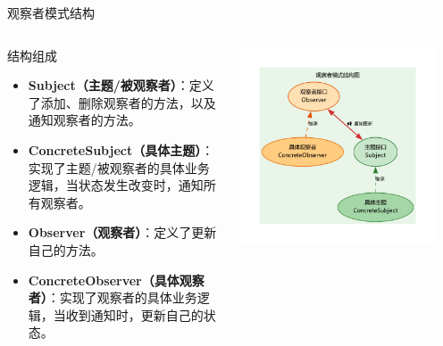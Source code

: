\documentclass[UTF8,aspectratio=169]{beamer}
\begin{document}
\begin{frame}{观察者模式结构}
    \begin{columns}
        \begin{column}{0.48\textwidth}
            \begin{ytublock}{结构组成}
                \begin{itemize}
                    \item \textbf{Subject（主题/被观察者）}：定义了添加、删除观察者的方法，以及通知观察者的方法。
                    \item \textbf{ConcreteSubject（具体主题）}：实现了主题/被观察者的具体业务逻辑，当状态发生改变时，通知所有观察者。
                    \item \textbf{Observer（观察者）}：定义了更新自己的方法。
                    \item \textbf{ConcreteObserver（具体观察者）}：实现了观察者的具体业务逻辑，当收到通知时，更新自己的状态。
                \end{itemize}
            \end{ytublock}
        \end{column}
        \begin{column}{0.48\textwidth}
            \begin{center}
                \includegraphics[width=0.9\textwidth]{images/observer_pattern.pdf}
            \end{center}
        \end{column}
    \end{columns}
\end{frame}
\end{document}

